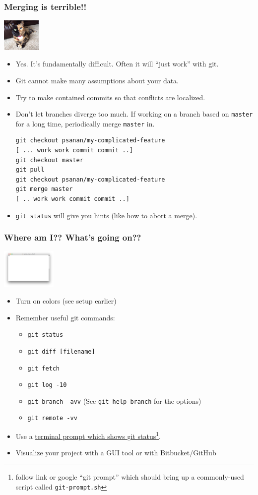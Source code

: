 \documentclass{beamer}
\begin{document}
\begin{frame}[fragile]
\frametitle{Merging is terrible!!}
\includegraphics[width=70px]{chimera.jpg}
\begin{itemize}
\item Yes. It's fundamentally difficult. Often it will ``just work'' with git.
\item Git cannot make many assumptions about your data.
\item Try to make contained commits so that conflicts are localized.
\item Don't let branches diverge too much. If working on a branch based on \texttt{master} for a long time, periodically merge \texttt{master} in.
\begin{lstlisting}
git checkout psanan/my-complicated-feature
[ ... work work commit commit ..]
git checkout master
git pull
git checkout psanan/my-complicated-feature
git merge master
[ .. work work commit commit ..]
\end{lstlisting}
\item \lstinline{git status} will give you hints (like how to abort a merge).
\end{itemize}
\end{frame}

\begin{frame}[fragile]
\frametitle{Where am I?? What's going on??}
\includegraphics[width=100px]{term}
\begin{itemize}
\item Turn on colors (see setup earlier)
\item
Remember useful git commands:
\begin{itemize}
\item \lstinline{git status}
\item \lstinline{git diff [filename]}
\item \lstinline{git fetch}
\item \lstinline{git log -10}
\item \lstinline{git branch -avv} (See \lstinline{git help branch} for the options)
\item \lstinline{git remote -vv}
\end{itemize}
\item Use a \href{https://raw.githubusercontent.com/git/git/master/contrib/completion/git-prompt.sh}{terminal prompt which shows git status}\footnote{follow link or google ``git prompt'' which should bring up a commonly-used script called \texttt{git-prompt.sh}}.
\item Visualize your project with a GUI tool or with Bitbucket/GitHub
\end{itemize}
\end{frame}
\end{document}
